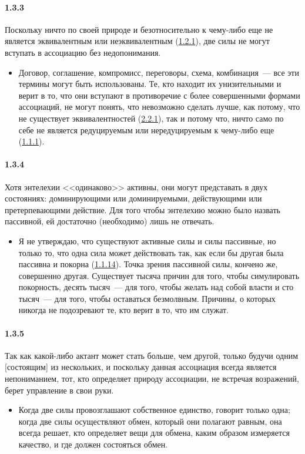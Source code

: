 \paragraph{1.3.3}\hypertarget{par:1.3.3}{} Поскольку ничто по своей природе и безотносительно к чему-либо еще не является эквивалентным или неэквивалентным (\hyperlink{par:1.2.1}{1.2.1}), две силы не могут вступать в ассоциацию без недопонимания. 
	\begin{itemize}
	\item Договор, соглашение, компромисс, переговоры, схема, комбинация~--- все эти термины могут быть использованы. Те, кто находит их унизительными и верит в то, что они вступают в противоречие с более совершенными формами ассоциаций, не могут понять, что невозможно сделать лучше, как потому, что не существует эквивалентностей (\hyperlink{par:2.2.1}{2.2.1}), так и потому что, ничто само по себе не является редуцируемым или нередуцируемым к чему-либо еще (\hyperlink{par:1.1.1}{1.1.1}).
	\end{itemize}

\paragraph{1.3.4}\hypertarget{par:1.3.4}{} Хотя энтелехии <<одинаково>> активны, они могут представать в двух состояниях: доминирующими или доминируемыми, действующими или претерпевающими действие. Для того чтобы энтелехию можно было назвать пассивной, ей достаточно (необходимо) лишь не отвечать.
	\begin{itemize}
	\item Я не утверждаю, что существуют активные силы и силы пассивные, но только то, что одна сила может действовать так, как если бы другая была пассивна и покорна (\hyperlink{par:1.1.14}{1.1.14}). Точка зрения пассивной силы, кончено же, совершенно другая. Существует тысяча причин для того, чтобы симулировать покорность, десять тысяч~--- для того, чтобы желать над собой власти и сто тысяч~--- для того, чтобы оставаться безмолвным. Причины, о которых никогда не подозревают те, кто верит в то, что им служат.
	\end{itemize}

\paragraph{1.3.5}\hypertarget{par:1.3.5}{} Так как какой-либо актант может стать больше, чем другой, только будучи одним [состоящим] из нескольких, и поскольку данная ассоциация всегда является непониманием, тот, кто определяет природу ассоциации, не встречая возражений, берет управление в свои руки. 
	\begin{itemize}
	\item Когда две силы провозглашают собственное единство, говорит только одна; когда две силы осуществляют обмен, который они полагают равным, она всегда решает, кто определяет вещи для обмена, каким образом измеряется качество, и где должен состояться обмен.
	\end{itemize}

